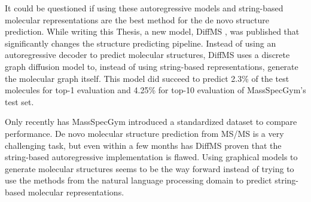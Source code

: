 It could be questioned if using these autoregressive models and string-based molecular representations are the best method for the de novo structure prediction.
While writing this Thesis, a new model, DiffMS \cite{bohde2025diffms}, was published that significantly changes the structure predicting pipeline.
Instead of using an autoregressive decoder to predict molecular structures, DiffMS uses a discrete graph diffusion model to, instead of using string-based representations, generate the molecular graph itself.
This model did succeed to predict 2.3\% of the test molecules for top-1 evaluation and 4.25\% for top-10 evaluation of MassSpecGym's test set.

Only recently has MassSpecGym introduced a standardized dataset to compare performance. De novo molecular structure prediction from \ac{MS/MS} is a very challenging task,
but even within a few months has DiffMS proven that the string-based autoregressive implementation is flawed.
Using graphical models to generate molecular structures seems to be the way forward instead of trying to use the methods from the natural language processing domain to predict string-based molecular representations.

